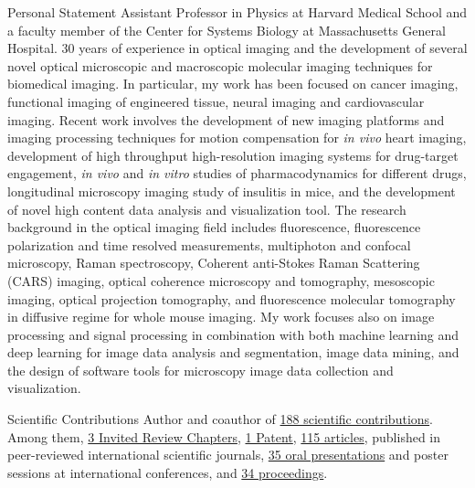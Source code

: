\documentclass{resume}
\begin{document}
\begin{category}{Personal Statement}
\citemnobullet 
 Assistant Professor in Physics at Harvard Medical School and a faculty member of the Center for Systems Biology at Massachusetts General Hospital. 30 years of experience in optical imaging and the development of several novel optical microscopic and macroscopic molecular imaging techniques for biomedical imaging. In particular, my work has been focused on cancer imaging, functional imaging of engineered tissue, neural imaging and cardiovascular imaging. Recent work involves the development of new imaging platforms and imaging processing techniques for motion compensation for {\it in vivo} heart imaging, development of high throughput high-resolution imaging systems for drug-target engagement, {\it in vivo} and {\it in vitro} studies of pharmacodynamics for different drugs, longitudinal microscopy imaging study of insulitis in mice, and the development of novel high content data analysis and visualization tool. The research background in the optical imaging field includes fluorescence, fluorescence polarization and time resolved measurements, multiphoton and confocal microscopy, Raman spectroscopy, Coherent anti-Stokes Raman Scattering (CARS) imaging, optical coherence microscopy and tomography, mesoscopic imaging, optical projection tomography, and fluorescence molecular tomography in diffusive regime for whole mouse imaging.  
My work focuses also on image processing and signal processing in combination with both machine learning and deep learning for image data analysis and segmentation, image data mining, and the design of software tools for microscopy image data collection and visualization. 


\end{category}
%
%
\begin{category}{Scientific Contributions}
\citemnobullet 
Author and coauthor of \href{https://cvinegoni.github.io/diffpubs}{188 scientific contributions}.
Among them, \href{https://cvinegoni.github.io/books/}{3 Invited Review
Chapters}, \href{https://cvinegoni.github.io/patents/}{1 Patent},  \href{https://cvinegoni.github.io/papers/}{115
articles},
 published in peer-reviewed international scientific
journals, \href{https://cvinegoni.github.io/proceedings/\#conferences}{35 oral
presentations}
and poster sessions at international conferences, and
\href{https://cvinegoni.github.io/proceedings/\#proceedings-papers}{34
proceedings}.
\end{category}
\end{document}
